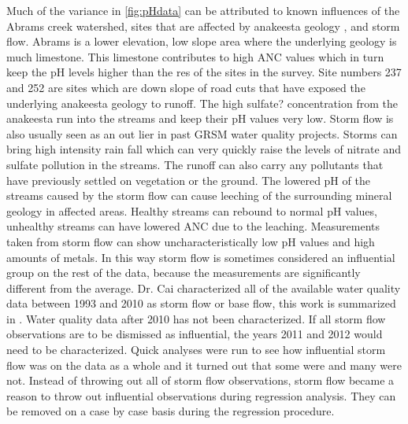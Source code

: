 Much of the variance in \autoref{fig:pHdata} can be attributed to known influences of the Abrams creek watershed, sites that are affected by anakeesta geology %
, and storm flow.  Abrams is a lower elevation, low slope area where the underlying geology is much limestone.  This limestone contributes to high ANC values which in turn keep the pH levels higher than the res of the sites in the survey.  Site numbers 237 and 252 are sites which are down slope of road cuts that have exposed the underlying anakeesta geology to runoff.  The high sulfate? concentration from the anakeesta run into the streams and keep their pH values very low.  
Storm flow is also usually seen as an out lier in past GRSM water quality projects.  Storms can bring high intensity rain fall which can very quickly raise the levels of nitrate and sulfate pollution in the streams.  The runoff can also carry any pollutants that have previously settled on vegetation or the ground.  The lowered pH of the streams caused by the storm flow can cause leeching of the surrounding mineral geology in affected areas. Healthy streams can rebound to normal pH values, unhealthy streams can have lowered ANC due to the leaching. %
 Measurements taken from storm flow can show uncharacteristically low pH values and high amounts of metals.  In this way storm flow is sometimes considered an influential group on the rest of the data, because the measurements are significantly different from the average.  Dr. Cai characterized all of the available water quality data between 1993 and 2010 as storm flow or base flow, this work is summarized in \citet{cai2012}.  Water quality data after 2010 has not been characterized.  If  all storm flow observations are to be dismissed as influential, the years 2011 and 2012 would need to be characterized.  Quick analyses were run to see how influential storm flow was on the data as a whole and it turned out that some were and many were not.  Instead of throwing out all of storm flow observations, storm flow became a reason to throw out influential observations during regression analysis.  They can be removed on a case by case basis during the regression procedure.
 
